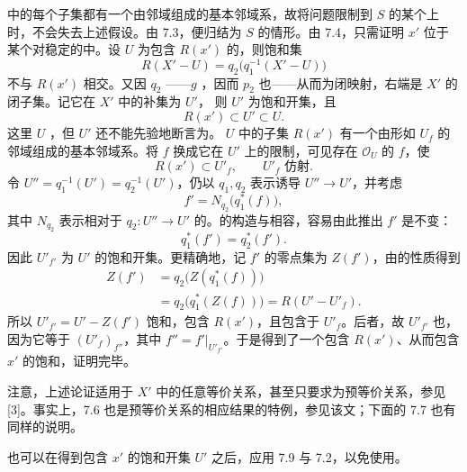 中的每个子集都有一个由邻域组成的基本邻域系，故将问题限制到 $S$ 的某个上时，不会失去上述假设。由 7.3，便归结为 $S$ 的情形。由 7.4，只需证明 $x'$ 位于某个对稳定的中。设 $U$ 为包含 $R(x')$ 的，则饱和集
\[
R(X'-U)=q_2\bigl(q_1^{-1}(X'-U)\bigr)
\]
不与 $R(x')$ 相交。又因 $q_2$ ——$g$ ，因而 $p_2$ 也——从而为闭映射，右端是 $X'$ 的闭子集。记它在 $X'$ 中的补集为 $U'$，
则 $U'$ 为饱和开集，且
\[
R(x')\subset U'\subset U.
\]
这里 $U$ ，但 $U'$ 还不能先验地断言为。 $U$ 中的子集 $R(x')$ 有一个由形如 $U_f$ 的邻域组成的基本邻域系。将 $f$ 换成它在 $U'$ 上的限制，可见存在 $\mathcal O_U$ 的 $f$，使
\[
R(x')\subset U'_f,\qquad U'_f\text{ 仿射}.
\]
令 $U''=q_1^{-1}(U')=q_2^{-1}(U')$，仍以 $q_1,q_2$ 表示诱导 $U''\to U'$，并考虑
\[
f'=N_{q_2}\bigl(q_1^*(f)\bigr),
\]
其中 $N_{q_2}$ 表示相对于 $q_2:U''\to U'$ 的。的构造与相容，容易由此推出 $f'$ 是不变：
\[
q_1^*(f')=q_2^*(f').
\]
因此 $U'_{f'}$ 为 $U'$ 的饱和开集。更精确地，记 $f'$ 的零点集为 $Z(f')$，由的性质得到
\[
\begin{aligned}
Z(f')&=q_2\bigl(Z(q_1^*(f))\bigr)\\
&=q_2\bigl(q_1^*(Z(f))\bigr)=R(U'-U'_f).
\end{aligned}
\]
所以 $U'_{f'}=U'-Z(f')$ 饱和，包含 $R(x')$，且包含于 $U'_f$。后者，故 $U'_{f'}$ 也，因为它等于 $(U'_f)_{f''}$，其中 $f''=f'|_{U'_{f'}}$。于是得到了一个包含 $R(x')$、从而包含 $x'$ 的饱和，证明完毕。

注意，上述论证适用于 $X'$ 中的任意等价关系，甚至只要求为预等价关系，参见 [3]。事实上，7.6 也是预等价关系的相应结果的特例，参见该文；下面的 7.7 也有同样的说明。

也可以在得到包含 $x'$ 的饱和开集 $U'$ 之后，应用 7.9 与 7.2，以免使用。

